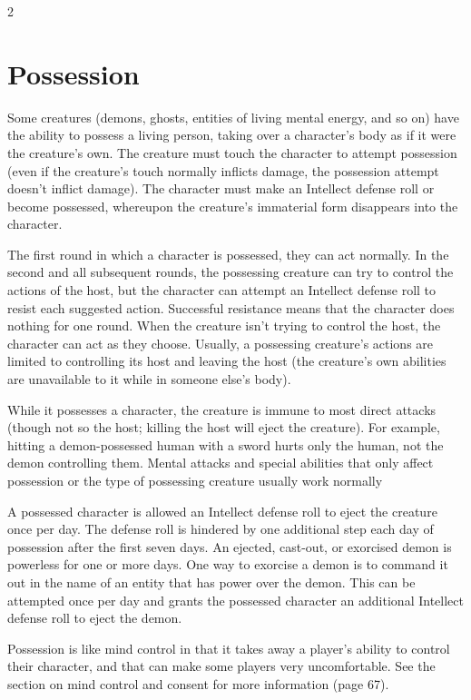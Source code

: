 \begin{multicols}{2}
\section{Possession}

Some creatures (demons, ghosts, entities of living mental energy, and so on) have the ability to possess a living person, taking over a character’s body as if it were the creature’s own. The creature must touch the character to attempt possession (even if the creature’s touch normally inflicts damage, the possession attempt doesn’t inflict damage). The character must make an Intellect defense roll or become possessed, whereupon the creature’s immaterial form disappears into the character.

The first round in which a character is possessed, they can act normally. In the second and all subsequent rounds, the possessing creature can try to control the actions of the host, but the character can attempt an Intellect defense roll to resist each suggested action. Successful resistance means that the character does nothing for one round. When the creature isn’t trying to control the host, the character can act as they choose. Usually, a possessing creature’s actions are limited to controlling its host and leaving the host (the creature’s own abilities are unavailable to it while in someone else’s body).

While it possesses a character, the creature is immune to most direct attacks (though not so the host; killing the host will eject the creature). For example, hitting a demon-possessed human with a sword hurts only the human, not the demon controlling them. Mental attacks and special abilities that only affect possession or the type of possessing creature usually work normally

A possessed character is allowed an Intellect defense roll to eject the creature once per day. The defense roll is hindered by one additional step each day of possession after the first seven days. An ejected, cast-out, or exorcised demon is powerless for one or more days. One way to exorcise a demon is to command it out in the name of an entity that has power over the demon. This can be attempted once per day and grants the possessed character an additional Intellect defense roll to eject the demon.

Possession is like mind control in that it takes away a player’s ability to control their character, and that can make some players very uncomfortable. See the section on mind control and consent for more information (page 67).


\end{multicols}
